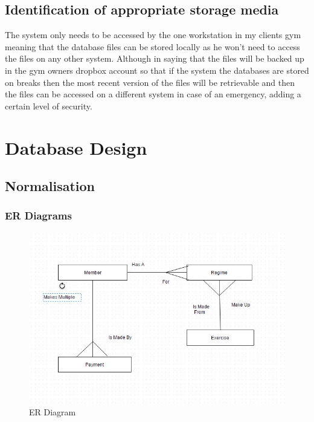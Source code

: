 \begin{itemize}
\subsection{Identification of appropriate storage media}

The system only needs to be accessed by the one workstation in my clients gym meaning that the database files can be stored locally as he won't need to access the files on any other system. Although in saying that the files will be backed up in the gym owners dropbox account so that if the system the databases are stored on breaks then the most recent version of the files will be retrievable and then the files can be accessed on a different system in case of an emergency, adding a certain level of security. 

\section{Database Design}

\subsection{Normalisation}

\subsubsection{ER Diagrams}

\begin{figure}[H]
    \includegraphics[width=\textwidth]{RelationshipDiagram1.jpg}
    \caption{ER Diagram} \label{fig: ER Diagram}
\end{figure}


\end{itemize}
